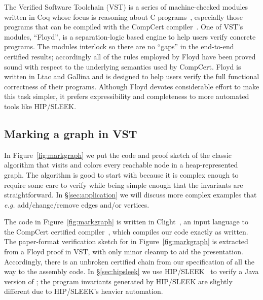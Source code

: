 \label{sec:vst}

The Verified Software Toolchain (VST) is a series of machine-checked modules written in Coq whose focus is reasoning about C programs~\cite{appel:programlogics}, especially those programs that can be compiled with the CompCert compiler~\cite{leroy:compcert}.  One of VST's modules, ``Floyd'', is a separation-logic based engine to help users
verify concrete programs.  The modules interlock so there are no ``gaps'' in the end-to-end certified results; accordingly all of the rules employed by Floyd have been proved sound with respect to the underlying semantics used by CompCert.  Floyd is written in Ltac and Gallina and is designed to help users verify the full functional correctness of their programs.  Although Floyd devotes considerable effort to make this task simpler, it prefers expressibility and completeness to more automated tools like HIP/SLEEK.

\subsection{Marking a graph in VST}
\label{sec:vstgraphmark}



In Figure~\ref{fig:markgraph} we put the code and proof sketch of the classic  algorithm that visits and colors every reachable node in a heap-represented graph.  The  algorithm is good to start with because it is complex enough to require some care to verify while being simple enough that the invariants are straightforward.  In \S\ref{sec:application} we will discuss more complex examples that \emph{e.g.} add/change/remove edges and/or vertices.

The code in Figure~\ref{fig:markgraph} is written in Clight~\cite{blazy:clight}, an input language to the CompCert certified compiler~\cite{leroy:compcert}, which compiles our code exactly as written.
The paper-format verification sketch for  in Figure~\ref{fig:markgraph} is extracted from
a Floyd proof in VST, with only minor cleanup to aid the presentation.
Accordingly, there is an unbroken certified chain from our specification of  all the way to the assembly code.  In \S\ref{sec:hipsleek} we use HIP/SLEEK~\cite{chin:hipsleek} to verify a Java version of ; the program invariants generated by HIP/SLEEK are slightly different due to HIP/SLEEK's heavier automation.


